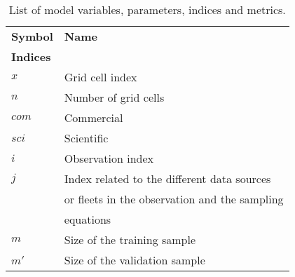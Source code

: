 \begin{center}
\begin{longtable}{ll}
\caption{List of model variables, parameters, indices and metrics.}
\label{tab:Chap1Notations} \\

\textbf{Symbol}                   & \textbf{Name}                                                                                                                                    \\
\textbf{Indices}                  &                                                                                                                                         \\
\(x\)                             & Grid cell index                                                                                                                         \\
\(n\)                             & Number of grid cells                                                                                                                    \\
\(com\)                           & Commercial                                                                                                                              \\
\(sci\)                           & Scientific                                                                                                                              \\
\(i\)                             & Observation index                                                                                                                              \\
\(j\)                             & Index related to the different data sources \\
                                  & or fleets in the observation and the sampling \\
                                  & equations                                     \\
\(m\)                             & Size of the training sample                                                                                                             \\
\(m'\)                            & Size of the validation sample                                                                                                           \\

\end{longtable}
\end{center}
